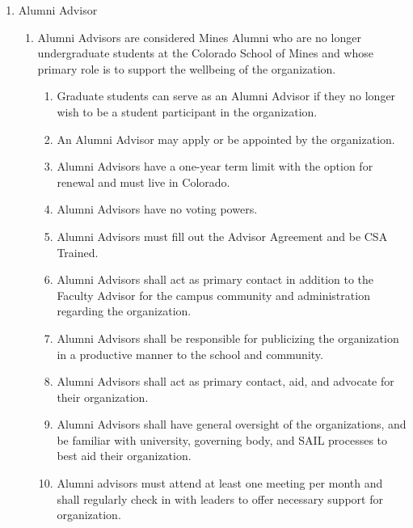 \documentclass[12pt,letterpaper]{article}
\begin{document}
\begin{enumerate}[label=\Alph*.]
    \item Alumni Advisor
    \begin{enumerate}[label=\arabic*)]
        \item Alumni Advisors are considered Mines Alumni who are no longer undergraduate students at the Colorado School of Mines and whose primary role is to support the wellbeing of the organization. 
        \begin{enumerate}[label=\roman*.]
            \item Graduate students can serve as an Alumni Advisor if they no longer wish to be a student participant in the organization. 
            \item An Alumni Advisor may apply or be appointed by the organization.
            \item Alumni Advisors have a one-year term limit with the option for renewal and must live in Colorado. 
            \item Alumni Advisors have no voting powers. 
            \item Alumni Advisors must fill out the Advisor Agreement and be CSA Trained. 
            \item Alumni Advisors shall act as primary contact in addition to the Faculty Advisor for the campus community and administration regarding the organization. 
            \item Alumni Advisors shall be responsible for publicizing the organization in a productive manner to the school and community. 
            \item Alumni Advisors shall act as primary contact, aid, and advocate for their organization. 
            \item Alumni Advisors shall have general oversight of the organizations, and be familiar with university, governing body, and SAIL processes to best aid their organization. 
            \item Alumni advisors must attend at least one meeting per month and shall regularly check in with leaders to offer necessary support for organization. 
        \end{enumerate}
    \end{enumerate}
\end{enumerate}
\end{document}
